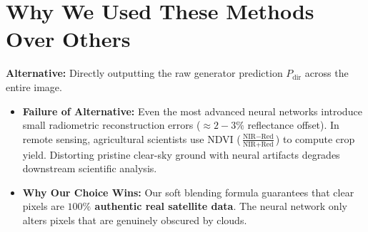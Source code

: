 \documentclass[11pt,a4paper]{article}
\begin{document}
\begin{table}[h!]
\centering
\small
\renewcommand{\arraystretch}{1.3}
\caption{Quantitative comparison highlighting the massive $+142\%$ gain in high-frequency detail retention.}
\end{table}

\section{Why We Used These Methods Over Others}

\begin{tcolorbox}[colback=white,colframe=primary,title=\textbf{1. Why Soft Cloud Blending over Direct 100\% Neural Generator Delivery?}]
\textbf{Alternative:} Directly outputting the raw generator prediction $P_{\text{dir}}$ across the entire image.
\begin{itemize}[leftmargin=1.2em, itemsep=0.2em]
    \item \textbf{Failure of Alternative:} Even the most advanced neural networks introduce small radiometric reconstruction errors ($\approx 2-3\%$ reflectance offset). In remote sensing, agricultural scientists use NDVI ($\frac{\text{NIR} - \text{Red}}{\text{NIR} + \text{Red}}$) to compute crop yield. Distorting pristine clear-sky ground with neural artifacts degrades downstream scientific analysis.
    \item \textbf{Why Our Choice Wins:} Our soft blending formula guarantees that clear pixels are \textbf{$100\%$ authentic real satellite data}. The neural network only alters pixels that are genuinely obscured by clouds.
\end{itemize}
\end{tcolorbox}
\end{document}
